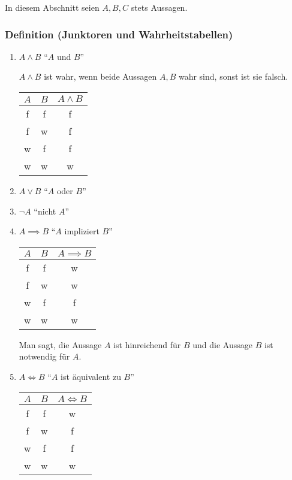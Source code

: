\documentclass{article}
\begin{document}
    In diesem Abschnitt seien $A,B,C$ stets Aussagen.
    \subsubsection{Definition (Junktoren und Wahrheitstabellen)}
      \begin{enumerate}[label=(\roman*)]
        \item $A \wedge B$ \enquote{$A$ und $B$}

          $A \wedge B$ ist wahr, wenn beide Aussagen $A,B$ wahr sind, sonst ist sie
          falsch.

          \begin{center}
            \begin{tabular}{ c c c }
              $A$ & $B$ & $A \wedge B$ \\ \hline
              f & f & f \\
              f & w & f \\
              w & f & f \\
              w & w & w \\
              \hline
            \end{tabular}
          \end{center}
        \item $A \vee B$ \enquote{$A$ oder $B$}
        \item $\neg A$ \enquote{nicht $A$}
        \item $A \implies B$ \enquote{$A$ impliziert $B$}
          \begin{center}
            \begin{tabular}{ c c c }
              $A$ & $B$ & $A \implies B$ \\ \hline
              f & f & w \\
              f & w & w \\
              w & f & f \\
              w & w & w \\
              \hline
            \end{tabular}
          \end{center}

          Man sagt, die Aussage $A$ ist hinreichend für $B$ und die Aussage $B$
          ist notwendig für $A$.
        \item $A \iff B$ \enquote{$A$ ist äquivalent zu $B$}
          \begin{center}
            \begin{tabular}{ c c c }
              $A$ & $B$ & $A \iff B$ \\ \hline
              f & f & w \\
              f & w & f \\
              w & f & f \\
              w & w & w \\
              \hline
            \end{tabular}
          \end{center}

      \end{enumerate}
\end{document}
